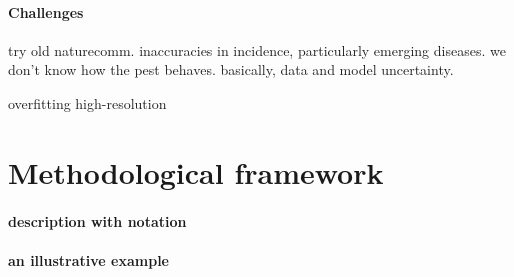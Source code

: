 \documentclass{article}
\begin{document}
\paragraph{Challenges} try old naturecomm. 
inaccuracies in incidence, particularly emerging
diseases. we don't know how the pest behaves. basically, data and model
uncertainty.

overfitting
high-resolution


\section{Methodological framework}
\paragraph{description with notation}

\paragraph{an illustrative example}
\end{document}
